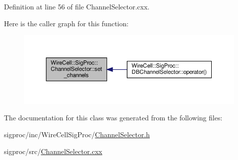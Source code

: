Definition at line 56 of file Channel\+Selector.\+cxx.

Here is the caller graph for this function\+:
\nopagebreak
\begin{figure}[H]
\begin{center}
\leavevmode
\includegraphics[width=350pt]{class_wire_cell_1_1_sig_proc_1_1_channel_selector_a4f6162b720052e906073139e952769e5_icgraph}
\end{center}
\end{figure}


The documentation for this class was generated from the following files\+:\begin{DoxyCompactItemize}
\item 
sigproc/inc/\+Wire\+Cell\+Sig\+Proc/\hyperlink{_channel_selector_8h}{Channel\+Selector.\+h}\item 
sigproc/src/\hyperlink{_channel_selector_8cxx}{Channel\+Selector.\+cxx}\end{DoxyCompactItemize}
